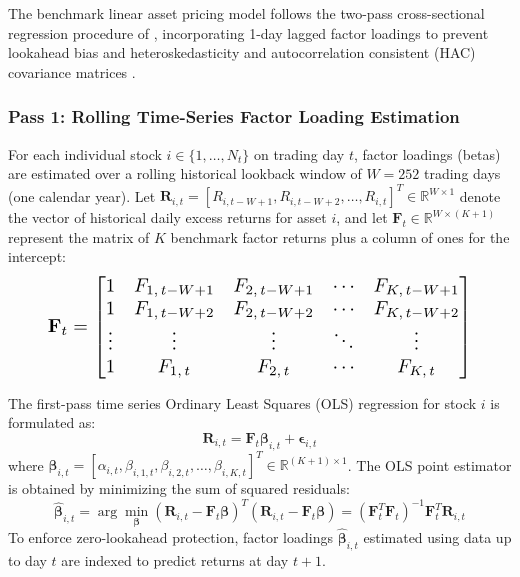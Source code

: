 The benchmark linear asset pricing model follows the two-pass cross-sectional regression procedure of \citet{fama1973risk}, incorporating 1-day lagged factor loadings to prevent lookahead bias and heteroskedasticity and autocorrelation consistent (HAC) covariance matrices \citep{newey1987simple}.

\subsubsection{Pass 1: Rolling Time-Series Factor Loading Estimation}
For each individual stock $i \in \{1, \dots, N_t\}$ on trading day $t$, factor loadings (betas) are estimated over a rolling historical lookback window of $W = 252$ trading days (one calendar year). Let $\mathbf{R}_{i,t} = [R_{i, t-W+1}, R_{i, t-W+2}, \dots, R_{i,t}]^T \in \mathbb{R}^{W \times 1}$ denote the vector of historical daily excess returns for asset $i$, and let $\mathbf{F}_t \in \mathbb{R}^{W \times (K+1)}$ represent the matrix of $K$ benchmark factor returns plus a column of ones for the intercept:
\begin{equation}
\resizebox{0.88\textwidth}{!}{$
\mathbf{F}_t = \begin{bmatrix}
1 & F_{1,\, t-W+1} & F_{2,\, t-W+1} & \cdots & F_{K,\, t-W+1} \\
1 & F_{1,\, t-W+2} & F_{2,\, t-W+2} & \cdots & F_{K,\, t-W+2} \\
\vdots & \vdots & \vdots & \ddots & \vdots \\
1 & F_{1,\, t} & F_{2,\, t} & \cdots & F_{K,\, t}
\end{bmatrix}
$}
\end{equation}

The first-pass time series Ordinary Least Squares (OLS) regression for stock $i$ is formulated as:
\begin{equation}
\mathbf{R}_{i,t} = \mathbf{F}_t \boldsymbol{\beta}_{i,t} + \boldsymbol{\epsilon}_{i,t}
\label{eq:ch3_pass1_ols}
\end{equation}
where $\boldsymbol{\beta}_{i,t} = [\alpha_{i,t}, \beta_{i,1,t}, \beta_{i,2,t}, \dots, \beta_{i,K,t}]^T \in \mathbb{R}^{(K+1) \times 1}$. The OLS point estimator is obtained by minimizing the sum of squared residuals:
\begin{equation}
\hat{\boldsymbol{\beta}}_{i,t} = \arg\min_{\boldsymbol{\beta}} (\mathbf{R}_{i,t} - \mathbf{F}_t \boldsymbol{\beta})^T (\mathbf{R}_{i,t} - \mathbf{F}_t \boldsymbol{\beta}) = \left( \mathbf{F}_t^T \mathbf{F}_t \right)^{-1} \mathbf{F}_t^T \mathbf{R}_{i,t}
\label{eq:ch3_beta_hat}
\end{equation}
To enforce zero-lookahead protection, factor loadings $\hat{\boldsymbol{\beta}}_{i,t}$ estimated using data up to day $t$ are indexed to predict returns at day $t+1$.

